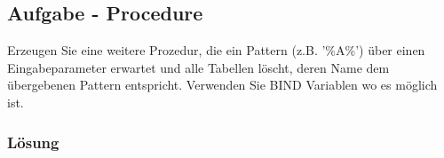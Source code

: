 \subsection{Aufgabe - Procedure}
\label{sec:uebung_02.aufgabe_06}
Erzeugen Sie eine weitere Prozedur, die ein Pattern (z.B. '\%A\%') über einen Eingabeparameter erwartet und alle Tabellen löscht, deren Name dem übergebenen Pattern entspricht. Verwenden Sie BIND Variablen wo es möglich ist.

\subsubsection*{Lösung}
\label{sec:uebung_02.aufgabe_06.loesung}
